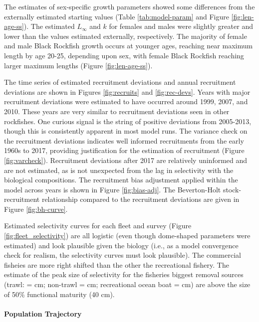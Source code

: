 \documentclass[11pt,
  english,
  letterpaper,
]{article}
\begin{document}
The estimates of sex-specific growth parameters showed some differences from the externally estimated starting values (Table \ref{tab:model-param} and Figure \ref{fig:len-age-ss}). The estimated \(L_{\infty}\) and \(k\) for females and males were slightly greater and lower than the values estimated externally, respectively. The majority of female and male Black Rockfish growth occurs at younger ages, reaching near maximum length by age 20-25, depending upon sex, with female Black Rockfish reaching larger maximum lengths (Figure \ref{fig:len-age-ss}).

The time series of estimated recruitment deviations and annual recruitment deviations are shown in Figures \ref{fig:recruits} and \ref{fig:rec-devs}. Years with major recruitment deviations were estimated to have occurred around 1999, 2007, and 2010. These years are very similar to recruitment deviations seen in other rockfishes. One curious signal is the string of positive deviations from 2005-2013, though this is consistently apparent in most model runs. The variance check on the recruitment deviations indicates well informed recruitments from the early 1960s to 2017, providing justification for the estimation of recruitment (Figure \ref{fig:varcheck}). Recruitment deviations after 2017 are relatively uninformed and are not estimated, as is not unexpected from the lag in selectivity with the biological compositions. The recruitment bias adjustment applied within the model across years is shown in Figure \ref{fig:bias-adj}. The Beverton-Holt stock-recruitment relationship compared to the recruitment deviations are given in Figure \ref{fig:bh-curve}.

Estimated selectivity curves for each fleet and survey (Figure \ref{fig:fleet_selectivity}) are all logistic (even though dome-shaped parameters were estimated) and look plausible given the biology (i.e., as a model convergence check for realism, the selectivity curves must look plausible). The commercial fisheies are more right shifted than the other the recreational fishery. The estimate of the peak size of selectivity for the fisheries biggest removal sources (trawl: = cm; non-trawl = cm; recreational ocean boat = cm) are above the size of 50\% functional maturity (40 cm).

\hypertarget{population-trajectory}{%
\paragraph{Population Trajectory}\label{population-trajectory}}
\end{document}
